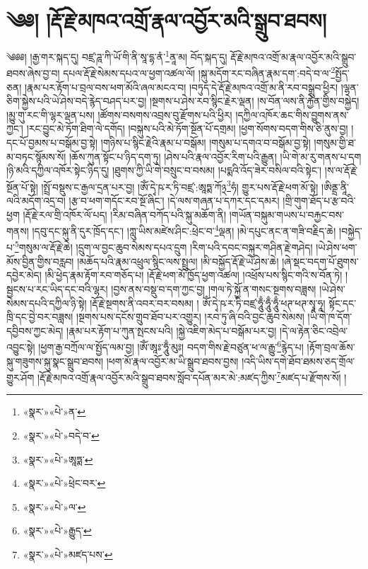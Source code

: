 \chapter{༄༅། །རྡོ་རྗེ་མཁའ་འགྲོ་རྣལ་འབྱོར་མའི་སྒྲུབ་ཐབས།}༄༅༅། །རྒྱ་གར་སྐད་དུ། བཛྲ་ཌཱ་ཀི་ཡོ་གི་ནི་སཱ་དྷ་ནཾ་\footnote{«སྣར་»«པེ་»ན་}ནཱ་མ། བོད་སྐད་དུ། རྡོ་རྗེ་མཁའ་འགྲོ་མ་རྣལ་འབྱོར་མའི་སྒྲུབ་ཐབས་ཞེས་བྱ་བ། དཔལ་རྡོ་རྗེ་སེམས་དཔའ་ལ་ཕྱག་འཚལ་ལོ། །སྐུ་མདོག་རང་བཞིན་རྣམ་དག་:བདེ་བ་ལ་\footnote{«སྣར་»«པེ་»བདེ་བ་}སྤྱོད་ཅན། །རྣམ་པར་རྟོག་པ་བྲལ་བས་ཕག་མོའི་ཞལ་མངའ་བ། །བཏུད་དེ་རྡོ་རྗེ་མཁའ་འགྲོ་མ་ནི་རབ་བསྒྲུབ་ཕྱིར། །ལྷན་ཅིག་སྐྱེས་པའི་ཡེ་ཤེས་བདེ་རྙེད་བཤད་པར་བྱ། །སྔགས་པ་ཤེས་རབ་སྙིང་རྗེར་ལྡན། །ས་བོན་ལས་ནི་རྐྱེན་གྱིས་བསྐྱེད། །མྱུ་གུ་རང་གི་ལྷར་ལྡན་པས། །ཚོགས་བསགས་འབྲས་བུ་རྫོགས་པའི་ཕྱིར། །དཀྱིལ་འཁོར་ཆང་གིས་བྱུགས་ནས་ཀྱང་། །རང་བྱུང་མེ་ཏོག་ཐིག་ལེ་དགོད། །བསྐུས་པའི་མེ་ཏོག་སྔོན་པོ་དགྲམ། །ཕྱག་སོགས་བདག་གིས་ཅི་ནུས་བྱ། །དང་པོ་བྱམས་པ་བསྒོམ་བྱ་སྟེ། །གཉིས་པ་སྙིང་རྗེའི་རྣམ་པ་བསྒོམ། །གསུམ་པ་དགའ་བ་བསྒོམ་བྱ་སྟེ། །གསུམ་གྱི་ཐ་མ་བཏང་སྙོམས་སོ། །ཆོས་ཀུན་སྟོང་པ་ཉིད་དག་ཏུ། །ཤེས་པའི་རྣལ་འབྱོར་རིག་པའི་རྒྱུན། །ཡི་གེ་མ་རུ་གནས་པ་དག །ཉི་མའི་དཀྱིལ་འཁོར་སྟེང་ཉིད་དུ། །ཐུགས་ཀྱི་ཡི་གེ་བསྲུང་བ་བསམ། །པདྨའི་འོད་ཟེར་བསིལ་བའི་སྟེང་། །ས་ལ་རྡོ་རྗེ་སྔོན་པོ་སྟེ། །སྤྲོ་བསྡུས་ང་རྒྱལ་དྲན་པར་བྱ། །ཨོཾ་དྭེ་ཥ་ར་ཏི་བཛྲ་:ཨཱཏྨ་ཀོ྅\footnote{«སྣར་»«པེ་»ཨཱཏྨ་}ཧཾ། གྱུར་པས་རྡོ་རྗེ་ཕག་མོ་སྟེ། །ཨིནྡྲ་ནཱི་ལའི་མདོག་འདྲ་བ། །རྩ་བ་ཕག་གདོང་རབ་སྔོ་ཞིང་། །དེ་ལས་གཞན་པ་དཀར་དང་དམར། །གྲི་གུག་ཐོད་པ་རྩ་བའི་ཕྱག །རྡོ་རྗེ་རལ་གྲི་འཁོར་ལོ་པད། །རིམ་བཞིན་བཀོད་པའི་སྐུ་མཆོག་ནི། །གཡོན་བསྐུམ་གཡས་པ་བརྐྱང་བས་གནས། །དབུ་དང་སྐུ་ནི་དུར་ཁྲོད་དང་། །ཀླུ་ཡིས་མཛེས་ཤིང་:ཕྲེང་བ་\footnote{«སྣར་»«པེ་»ཕྲེང་བར་}ལྡན། །མེ་དཔུང་ནང་ན་གཟི་བརྗིད་ཆེ། །བསྐྱེད་པ་\footnote{«སྣར་»«པེ་»ལ་}གསུམ་ལ་རྡོ་རྗེ་ཆེ། །དྲུག་ལ་བྱང་ཆུབ་སེམས་དཔའ་དྲུག །རིག་པའི་དབང་བསྐུར་གཤིན་རྗེ་གཤེད། །ཡེ་ཤེས་ཕག་མོས་བྱིན་གྱིས་བརླབ། །མཆོད་པའི་རྣམ་འཕྲུལ་སྙིང་ལས་སྤྲུལ། །མི་བསྐྱོད་རྡོ་རྗེ་ཡེ་ཤེས་ཆེ། །ཞེ་སྡང་བདག་པོ་ཐུགས་དབྱེར་མེད། །མི་ཕྱེད་རྣམ་རྟོག་རབ་གཅོད་པ། །རྡོ་རྗེ་ཕག་མོ་ཁྱོད་ཕྱག་འཚལ། །འཕྲོས་པས་སྙིང་གའི་ས་བོན་ཏེ། །སྦྱངས་པ་རང་ཡིད་དང་བའི་ལྷར། །བྱས་ནས་བསྡུ་བ་དག་ཀྱང་བྱ། །གལ་ཏེ་སྐྱོ་ན་གསང་སྔགས་བཟླས། །ཡེ་ཤེས་སེམས་དཔའི་དཀྱིལ་ཉི་སྟེ། །རྡོ་རྗེ་སྔགས་ནི་འབར་བར་བསམ། །
ཨོཾ་དྭེ་ཥ་ར་ཏི་བཛྲ་ཧཱུྃ་ཧཱུྃ་ཧཱུྃ་ཕཊ་ཕཊ་སྭཱ་ཧཱ། སྟོང་དང་ཁྲི་དང་བྱེ་བར་བཟླས། །སྔགས་པས་དངོས་གྲུབ་ཐོབ་པར་འགྱུར། །རབ་ཏུ་ཞི་བའི་བྱང་ཆུབ་སེམས། །ཡི་གེ་ཁ་དོག་དབྱིབས་ཀྱང་མེད། །རྣམ་པར་རྟོག་པ་ཀུན་སྤངས་པའི། །སྐྱེ་འཇིག་མེད་པ་བསྒོམ་པར་བྱ། །དེ་ལ་རྟེན་ཅིང་འབྲེལ་འབྱུང་སྟེ། །ཕྱག་རྒྱ་བཀྲོལ་ལ་སྤྱོད་ལམ་བྱ། །ཨོཾ་ཨཱཿ་ཧཱུྃ་མུཿ། བདག་གིས་རྗེ་བཙུན་ཕ་ལ་རྒྱུ་\footnote{«སྣར་»«པེ་»རྒྱུད་}རྙེད་པ། །རྟོག་བྲལ་ཆོས་སྐུ་གཟུགས་སྐུ་སྣང་སྒྲུབ་ཐབས། །ཕག་མོ་རྣལ་འབྱོར་མ་ཡི་སྒྲུབ་ཐབས་བྱས། །འདི་ཡིས་དགེ་ཐོབ་ཐམས་ཅད་གྲོལ་གྱུར་ཤོག །རྡོ་རྗེ་མཁའ་འགྲོ་རྣལ་འབྱོར་མའི་སྒྲུབ་ཐབས་སློབ་དཔོན་མར་མེ་:མཛད་ཀྱིས་\footnote{«སྣར་»«པེ་»མཛད་པས་}མཛད་པ་རྫོགས་སོ། ། 